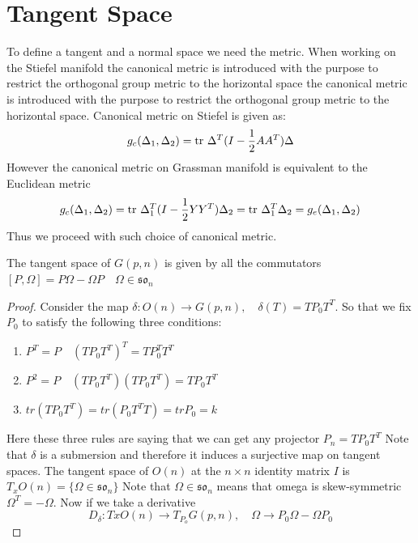 \documentclass[11pt,a4paper]{report}
\begin{document}
\section{Tangent Space}
To define a tangent and a normal space we need the metric.
When working on the Stiefel manifold the canonical metric is introduced with the purpose to restrict the orthogonal group metric to the horizontal space the canonical metric is introduced with the purpose to restrict the orthogonal group metric to the horizontal space.
Canonical metric on Stiefel is given as:
$$ g_c(\Delta_1, \Delta_2) = \textrm{tr } \Delta ^T (I - \frac{1}{2} A A^T) \Delta 
$$
However the canonical metric on Grassman manifold is equivalent to the Euclidean metric
$$
g_c(\Delta_1, \Delta_2) = \textrm{tr } \Delta_1^T (I - \frac{1}{2} Y Y^T) \Delta_2 = \textrm{tr } \Delta_1^T \Delta_2 = g_e(\Delta_1,\Delta_2) 
$$
Thus we proceed with such choice of canonical metric.
\begin{Prop}
   The tangent space of $G(p,n)$ is given by all the commutators $ [ P, \Omega] = P \Omega - \Omega P \quad \Omega \in \mathfrak{so}_n  $ 
\end{Prop}
\begin{proof}
Consider the map $\delta: O(n) \to G(p,n), \quad \delta(T) = T P_0 T^T$. So that we fix $P_0$ to satisfy the following three conditions:
\begin{enumerate}
    \item $P^T = P \quad (T P_0 T^T)^T = T P_0^T T^T$
    \item $P^2 = P \quad (T P_0 T^T) (T P_0 T^T) = T P_0 T^T$
    \item $tr(T P_0 T^T) = tr (P_0 T^T T) = tr P_0 = k$
\end{enumerate}
Here these three rules are saying that we can get any projector $P_n = T P_0 T^T$
Note that $\delta$ is a submersion and therefore it induces a surjective map on tangent spaces.
The tangent space of $O(n)$ at the $n \times n$ identity matrix $I$ is
$ T_x O(n) = \{ \Omega \in \mathfrak{so}_n \} $ Note that $\Omega \in \mathfrak{so}_n$ means that omega is skew-symmetric $\Omega^T = -\Omega$.
Now if we take a derivative
$$ D_{\delta} : Tx O(n) \to T_{P_o} G(p,n), \quad \Omega \to P_0 \Omega - \Omega P_0 $$
\end{proof}
\end{document}

